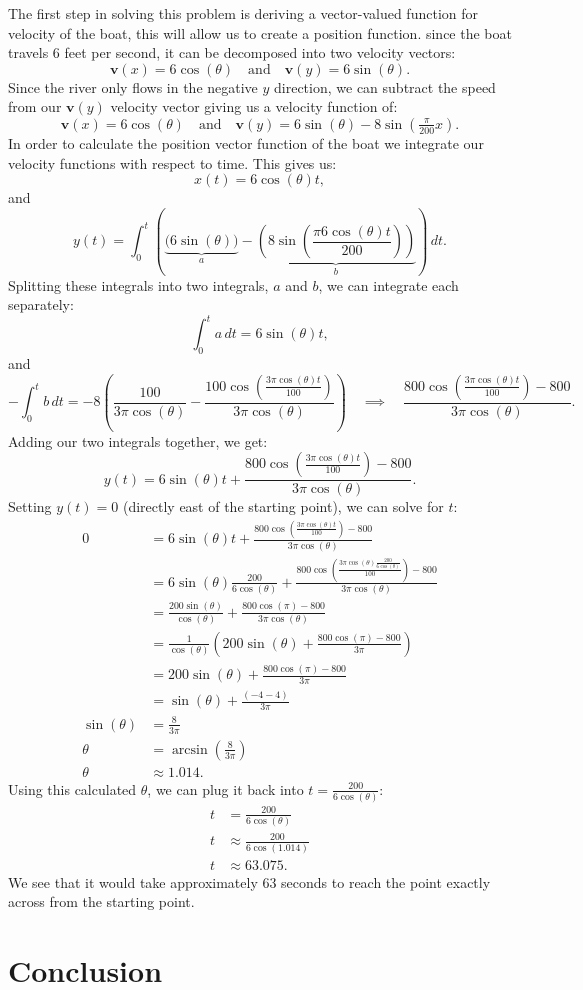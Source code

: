 \documentclass{article}
\newcommand{\mb}[1]{\mathbf{#1}}
\begin{document}
The first step in solving this problem is deriving a vector-valued function for velocity of the boat, this will allow us to create a position function. 
since the boat travels 6 feet per second, it can be decomposed into two velocity vectors:
\[
  \mb{v}(x) = 6\cos(\theta) \quad \text{and} \quad \mb{v}(y) = 6\sin(\theta).
\] 
Since the river only flows in the negative \(y\) direction, we can subtract the speed from our \(\mb{v}(y)\) velocity vector giving us a velocity function of:
\[
  \mb{v}(x) = 6\cos(\theta) \quad \text{and} \quad \mb{v}(y) = 6\sin(\theta) - 8\sin(\tfrac{\pi}{200}x).
\]
In order to calculate the position vector function of the boat we integrate our velocity functions with respect to time. This gives us:
\[
    x(t) = 6\cos(\theta) t,
\]
and 
\[
    y(t) = \int_0^{t} \left(\underbrace{\bigl(6 \sin(\theta)\bigr)}_{a} - \underbrace{\left(8 \sin \left(\frac{\pi 6\cos(\theta)t}{200}\right)\right)}_{b}\right) \, dt.
\]
Splitting these integrals into two integrals, \(a\) and \(b\), we can integrate each separately:
\[
    \int_0^{t} a \, dt = 6\sin(\theta) t,
\]
and 
\[
    -\int_0^{t} b \, dt = -8\left(\frac{100}{3\pi\cos(\theta)} - \frac{100\cos\left(\frac{3\pi\cos(\theta)t}{100}\right)}{3\pi\cos(\theta)}\right) \quad \implies \quad \frac{800\cos\left(\frac{3\pi\cos(\theta)t}{100}\right) - 800}{3\pi\cos(\theta)}.
\]
Adding our two integrals together, we get:
\[
    y(t) = 6\sin(\theta) t + \frac{800\cos\left(\frac{3\pi\cos(\theta)t}{100}\right) - 800}{3\pi\cos(\theta)}. 
\]
Setting \(y(t) = 0\) (directly east of the starting point), we can solve for \(t\):
\begin{align*}
  0 &= 6 \sin(\theta) t + \frac{800\cos\left(\frac{3\pi\cos(\theta)t}{100}\right) - 800}{3\pi\cos(\theta)} \\ 
  &= 6 \sin(\theta) \frac{200}{6 \cos(\theta)} + \frac{800\cos\left(\frac{3\pi\cos(\theta)\frac{200}{6 \cos(\theta)}}{100}\right) - 800}{3\pi\cos(\theta)} \\ 
  &= \frac{200 \sin(\theta)}{\cos(\theta)} + \frac{800\cos(\pi) - 800}{3\pi\cos(\theta)} \\
  &= \frac{1}{\cos(\theta)} \left(200 \sin(\theta) + \frac{800\cos(\pi) - 800}{3\pi}\right) \\
  &= 200 \sin(\theta) + \frac{800\cos(\pi) - 800}{3\pi} \\
  &= \sin(\theta) + \frac{(-4 - 4)}{3 \pi} \\
  \sin(\theta) &= \frac{8}{3 \pi} \\
  \theta &= \arcsin \left(\frac{8}{3 \pi}\right) \\
  \theta &\approx 1.014.
\end{align*}
Using this calculated \(\theta\), we can plug it back into \(t = \frac{200}{6 \cos(\theta)}\):
\begin{align*}
    t &=  \frac{200}{6 \cos(\theta)} \\
    t &\approx \frac{200}{6 \cos(1.014)} \\
    t &\approx 63.075.
\end{align*}
We see that it would take approximately 63 seconds to reach the point exactly across from the starting point.





\section{Conclusion}
\end{document}
